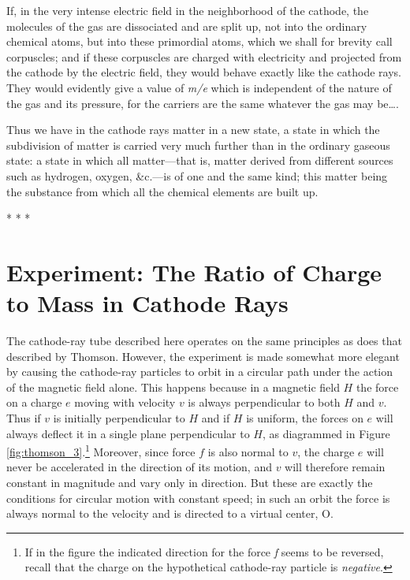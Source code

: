 If, in the very intense electric field in the neighborhood of the
cathode, the molecules of the gas are dissociated and are split up, not
into the ordinary chemical atoms, but into these primordial atoms, which
we shall for brevity call corpuscles; and if these corpuscles are
charged with electricity and projected from the cathode by the electric
field, they would behave exactly like the cathode rays. They would
evidently give a value of \emph{m/e} which is independent of the nature
of the gas and its pressure, for the carriers are the same whatever the
gas may be\ldots.

Thus we have in the cathode rays matter in a new state, a state in which
the sub\-di\-vi\-sion of matter is carried very much further than in the
ordinary gaseous state: a state in which all matter---that is, matter
derived from different sources such as hydrogen, oxygen, \&c.---is of
one and the same kind; this matter being the substance from which all
the chemical elements are built up.\\
\centerline{* * *}
%
\section*{Experiment: The Ratio of Charge to Mass in Cathode Rays}

The cathode-ray tube de\-scribed here operates on the same principles as
does that de\-scribed by Thomson. However, the experiment is made somewhat
more elegant by causing the cathode-ray particles to orbit in a circular
path under the action of the magnetic field alone. This happens because
in a magnetic field $H$ the force on a charge $e$ moving with
velocity $v$ is always per\-pen\-dic\-u\-lar to both $H$ and $v$.
Thus if $v$ is initially per\-pen\-dic\-u\-lar to $H$ and if $H$
is uniform, the forces on $e$ will always deflect it in a single
plane per\-pen\-dic\-u\-lar to $H$, as diagrammed in Figure
\ref{fig:thomson_3}.\footnote{If in the figure the indicated direction for the force
  \emph{f} seems to be reversed, recall that the charge on the
  hypothetical cathode-ray particle is \emph{negative}.} Moreover, since
force $f$ is also normal to $v$, the charge $e$ will
never be accelerated in the direction of its motion, and $v$ will
therefore remain constant in magnitude and vary only in direction. But
these are exactly the conditions for circular motion with constant
speed; in such an orbit the force is always normal to the velocity and
is directed to a virtual center, O.

